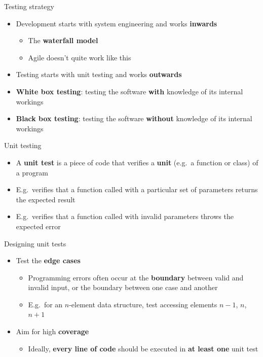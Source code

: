 \begin{frame}{Testing strategy}
    \begin{itemize}
        \item Development starts with system engineering and works \textbf{inwards} \pause
            \begin{itemize}
                \item The \textbf{waterfall model} \pause
                \item Agile doesn't quite work like this \pause
            \end{itemize}
        \item Testing starts with unit testing and works \textbf{outwards} \pause
        \item \textbf{White box testing}: testing the software \textbf{with} knowledge of its internal workings \pause
        \item \textbf{Black box testing}: testing the software \textbf{without} knowledge of its internal workings
    \end{itemize}
\end{frame}

\begin{frame}{Unit testing}
    \begin{itemize}
        \item A \textbf{unit test} is a piece of code that verifies a \textbf{unit} (e.g.\ a function or class) of a program \pause
        \item E.g.\ verifies that a function called with a particular set of parameters returns the expected result \pause
        \item E.g.\ verifies that a function called with invalid parameters throws the expected error
    \end{itemize}
\end{frame}

\begin{frame}{Designing unit tests}
    \begin{itemize}
        \item Test the \textbf{edge cases} \pause
            \begin{itemize}
                \item Programming errors often occur at the \textbf{boundary} between valid and invalid input,
                    or the boundary between one case and another \pause
                \item E.g.\ for an $n$-element data structure, test accessing elements $n-1$, $n$, $n+1$ \pause
            \end{itemize}
        \item Aim for high \textbf{coverage} \pause
            \begin{itemize}
                \item Ideally, \textbf{every line of code} should be executed in \textbf{at least one} unit test
            \end{itemize}
    \end{itemize}
\end{frame}

